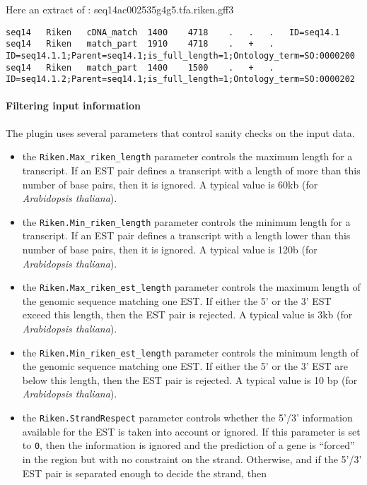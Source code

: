 Here an extract of : seq14ac002535g4g5.tfa.riken.gff3
\begin{Verbatim}[fontsize=\tiny]
seq14	Riken	cDNA_match	1400	4718	.	.	.	ID=seq14.1
seq14	Riken	match_part	1910	4718	.	+	.	ID=seq14.1.1;Parent=seq14.1;is_full_length=1;Ontology_term=SO:0000200
seq14	Riken	match_part	1400	1500	.	+	.	ID=seq14.1.2;Parent=seq14.1;is_full_length=1;Ontology_term=SO:0000202
\end{Verbatim}


\paragraph{Filtering input information}

The plugin uses several parameters that control sanity
checks on the input data.
\begin{itemize}
\item the \texttt{Riken.Max\_riken\_length} parameter controls the
  maximum length for a transcript. If an EST pair defines a transcript
  with a length of more than this number of base pairs, then it is
  ignored. A typical value is 60kb (for \textit{Arabidopsis
    thaliana}).
\item the \texttt{Riken.Min\_riken\_length} parameter controls the
  minimum length for a transcript. If an EST pair defines a transcript
  with a length lower than this number of base pairs, then it is
  ignored. A typical value is 120b (for \textit{Arabidopsis
    thaliana}).
\item the \texttt{Riken.Max\_riken\_est\_length} parameter controls the
  maximum length of the genomic sequence matching one EST. If either
  the 5' or the 3' EST exceed this length, then the EST pair is
  rejected. A typical value is 3kb (for \textit{Arabidopsis
    thaliana}).
\item the \texttt{Riken.Min\_riken\_est\_length} parameter controls the
  minimum length of the genomic sequence matching one EST.  If either
  the 5' or the 3' EST are below this length, then the EST pair is
  rejected. A typical value is 10 bp (for \textit{Arabidopsis
    thaliana}).
\item the \texttt{Riken.StrandRespect} parameter controls whether the
  5'/3' information available for the EST is taken into account or
  ignored. If this parameter is set to \texttt{0}, then the
  information is ignored and the prediction of a gene is ``forced'' in
  the region but with no constraint on the strand.  Otherwise, and if
  the 5'/3' EST pair is separated enough to decide the strand, then

\end{itemize}
